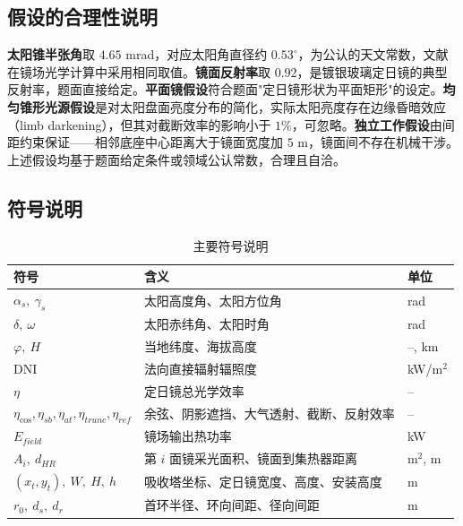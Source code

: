 \documentclass[12pt]{ctexart}
\begin{document}
\subsection{假设的合理性说明}
\textbf{太阳锥半张角}取 $4.65$ mrad，对应太阳角直径约 $0.53^\circ$，为公认的天文常数，文献\cite{zhang} 在镜场光学计算中采用相同取值。\textbf{镜面反射率}取 $0.92$，是镀银玻璃定日镜的典型反射率，题面直接给定。\textbf{平面镜假设}符合题面"定日镜形状为平面矩形"的设定。\textbf{均匀锥形光源假设}是对太阳盘面亮度分布的简化，实际太阳亮度存在边缘昏暗效应（limb darkening），但其对截断效率的影响小于 $1\%$，可忽略。\textbf{独立工作假设}由间距约束保证——相邻底座中心距离大于镜面宽度加 $5$ m，镜面间不存在机械干涉。上述假设均基于题面给定条件或领域公认常数，合理且自洽。

\subsection{符号说明}
\begin{table}[H]
\centering
\begin{tabular}{lll}
\toprule
符号 & 含义 & 单位 \\
\midrule
$\alpha_s,\ \gamma_s$ & 太阳高度角、太阳方位角 & rad \\
$\delta,\ \omega$ & 太阳赤纬角、太阳时角 & rad \\
$\varphi,\ H$ & 当地纬度、海拔高度 & --, km \\
$\text{DNI}$ & 法向直接辐射辐照度 & kW/m$^2$ \\
$\eta$ & 定日镜总光学效率 & -- \\
$\eta_{\cos},\eta_{sb},\eta_{at},\eta_{trunc},\eta_{ref}$ & 余弦、阴影遮挡、大气透射、截断、反射效率 & -- \\
$E_{field}$ & 镜场输出热功率 & kW \\
$A_i,\ d_{HR}$ & 第 $i$ 面镜采光面积、镜面到集热器距离 & m$^2$, m \\
$(x_t,y_t),\ W,\ H,\ h$ & 吸收塔坐标、定日镜宽度、高度、安装高度 & m \\
$r_0,\ d_s,\ d_r$ & 首环半径、环向间距、径向间距 & m \\
\bottomrule
\end{tabular}
\caption{主要符号说明}
\label{tab:symbols}
\end{table}
\end{document}
